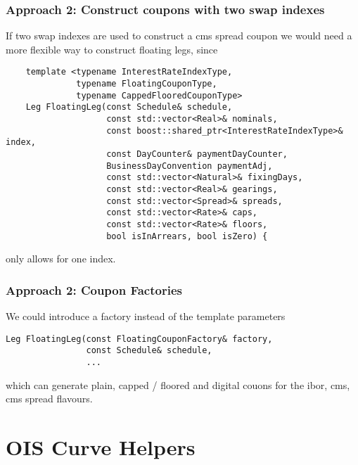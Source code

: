 \documentclass{beamer}
\begin{document}
\begin{frame}[fragile]
\frametitle{Approach 2: Construct coupons with two swap indexes}
If two swap indexes are used to construct a cms spread coupon we would need
a more flexible way to construct floating legs, since
\begin{verbatim}
    template <typename InterestRateIndexType,
              typename FloatingCouponType,
              typename CappedFlooredCouponType>
    Leg FloatingLeg(const Schedule& schedule,
                    const std::vector<Real>& nominals,
                    const boost::shared_ptr<InterestRateIndexType>& index,
                    const DayCounter& paymentDayCounter,
                    BusinessDayConvention paymentAdj,
                    const std::vector<Natural>& fixingDays,
                    const std::vector<Real>& gearings,
                    const std::vector<Spread>& spreads,
                    const std::vector<Rate>& caps,
                    const std::vector<Rate>& floors,
                    bool isInArrears, bool isZero) {
\end{verbatim}
only allows for one index. 
\end{frame}

\begin{frame}[fragile]
\frametitle{Approach 2: Coupon Factories}
We could introduce a factory instead of the template parameters
\begin{verbatim}
Leg FloatingLeg(const FloatingCouponFactory& factory,
                const Schedule& schedule,
                ...
\end{verbatim}
which can generate plain, capped / floored and digital
couons for the ibor, cms, cms spread flavours.
\end{frame}



\section{OIS Curve Helpers}
\end{document}

